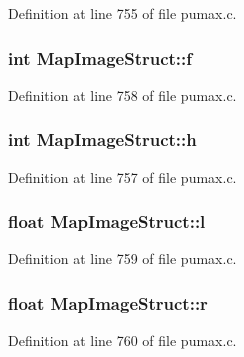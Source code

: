 \-Definition at line 755 of file pumax.\-c.

\hypertarget{struct_map_image_struct_a7c3018a3883c438e08c5632a49e39c66}{
\subsubsection[{f}]{\setlength{\rightskip}{0pt plus 5cm}int {\bf \-Map\-Image\-Struct\-::f}}}
\label{struct_map_image_struct_a7c3018a3883c438e08c5632a49e39c66}


\-Definition at line 758 of file pumax.\-c.

\hypertarget{struct_map_image_struct_a7c1e3b72791d55ecbe02d3325a69f882}{
\subsubsection[{h}]{\setlength{\rightskip}{0pt plus 5cm}int {\bf \-Map\-Image\-Struct\-::h}}}
\label{struct_map_image_struct_a7c1e3b72791d55ecbe02d3325a69f882}


\-Definition at line 757 of file pumax.\-c.

\hypertarget{struct_map_image_struct_a46fe3297a24177fa1aef6e5cf19a4b4b}{
\subsubsection[{l}]{\setlength{\rightskip}{0pt plus 5cm}float {\bf \-Map\-Image\-Struct\-::l}}}
\label{struct_map_image_struct_a46fe3297a24177fa1aef6e5cf19a4b4b}


\-Definition at line 759 of file pumax.\-c.

\hypertarget{struct_map_image_struct_a0c135dc0852d411fd87b7ac84ba55664}{
\subsubsection[{r}]{\setlength{\rightskip}{0pt plus 5cm}float {\bf \-Map\-Image\-Struct\-::r}}}
\label{struct_map_image_struct_a0c135dc0852d411fd87b7ac84ba55664}


\-Definition at line 760 of file pumax.\-c.

